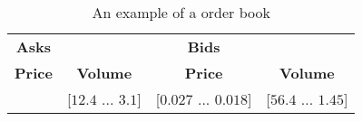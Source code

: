 \begin{table}[ht]
    \centering
    \begin{tabular}{c c| c c}
        \hline
         \textbf{Asks} & & \textbf{Bids} & \\
         \textbf{Price} & \textbf{Volume} & \textbf{Price} & \textbf{Volume}\\
         \hline
         [$0.028$ ... $0.14$] & [$12.4$ ... $3.1$] & [$0.027$ ... $0.018$] & [$56.4$ ... $1.45$]\\
         \hline
    \end{tabular}
    \caption{An example of a order book}
    \label{tab:order_book}
\end{table}